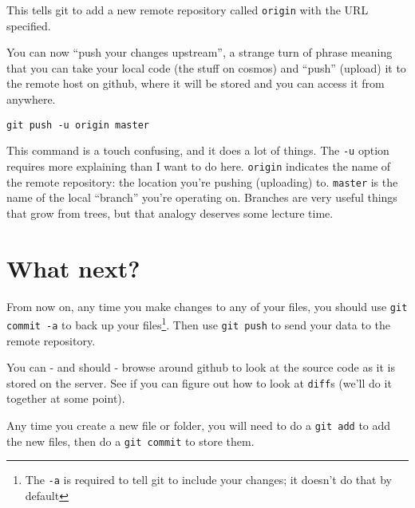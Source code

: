 \documentclass{article}
\begin{document}
\begin{spacing}{1.0}
This tells git to add a new remote repository called \texttt{origin} with the URL
specified.

You can now “push your changes upstream”, a strange turn of phrase meaning that
you can take your local code (the stuff on cosmos) and “push” (upload) it to
the remote host on github, where it will be stored and you can access it from
anywhere.

\verb|git push -u origin master|

This command is a touch confusing, and it does a lot of things.  The
\texttt{-u} option requires more explaining than I want to do here.
\texttt{origin} indicates the name of the remote repository: the location
you're pushing (uploading) to.  \texttt{master} is the name of the local
“branch” you're operating on.  Branches are very useful things that grow from
trees, but that analogy deserves some lecture time.


\section{What next?}
From now on, any time you make changes to any of your files, you should
use \verb|git commit -a| to back up your files\footnote{The \texttt{-a} is required
to tell git to include your changes; it doesn't do that by default}.  Then use \verb|git push|
to send your data to the remote repository.

You can - and should - browse around github to look at the source code as it is
stored on the server.  See if you can figure out how to look at \texttt{diff}s
(we'll do it together at some point).

Any time you create a new file or folder, you will need to do a \verb|git add|
to add the new files, then do a \verb|git commit| to store them.


\end{spacing}
\end{document}

